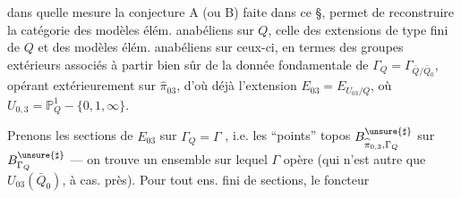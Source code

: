 dans quelle mesure la conjecture A (ou B) faite dans ce §, permet de reconstruire la catégorie des modèles élém. anabéliens sur $Q$,  celle des extensions de type fini de $Q$ et des modèles élém. anabéliens sur ceux-ci, en termes des groupes extérieurs  associés à partir bien sûr de la donnée fondamentale de $\Gamma_Q=\Gamma_{\bar Q/\bar Q_0}$, opérant extérieurement sur $\widehat\pi_{03}$, d'où déjà l'extension $E_{03}=E_{U_{03}/Q}$, où $U_{0,3}=\mathbb P^1_Q-\{0,1,\infty\}$.

Prenons les  sections de $E_{03}$ sur $\Gamma_Q=\Gamma$ , i.e. les ``points''   topos $B_{\widehat\pi_{0,3},\Gamma_Q}^{\unsure{\sharp}}$ sur $B_{\Gamma_Q}^{\unsure{\sharp}}$ — on trouve un ensemble sur lequel $\Gamma$ opère (qui n'est autre que $U_{03}(\bar Q_0)$, à  cas. près). Pour tout ens. fini  de sections,  le foncteur
